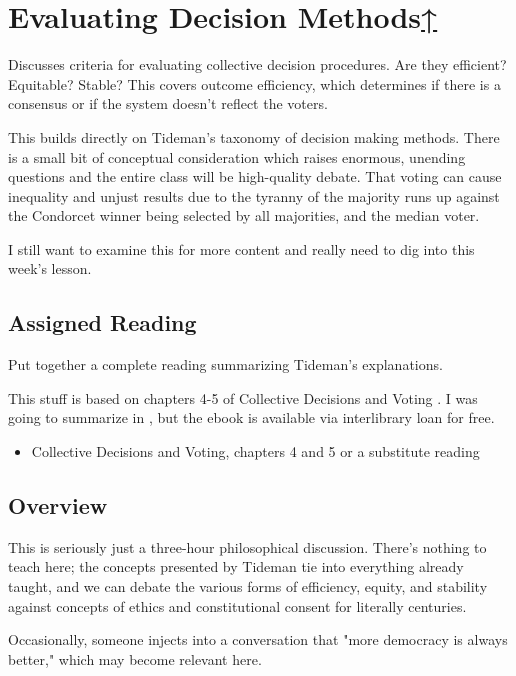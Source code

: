 \label{cur:evaluating-decision-methods}
\section{Evaluating Decision Methods\hyperref[syllabus]{↑}}

Discusses criteria for evaluating collective decision procedures.  Are they efficient?  Equitable?  Stable?  This covers outcome efficiency, which determines if there is a consensus or if the system doesn't reflect the voters.

This builds directly on Tideman's taxonomy of decision making methods.  There is a small bit of conceptual consideration which raises enormous, unending questions and the entire class will be high-quality debate.  That voting can cause inequality and unjust results due to the tyranny of the majority runs up against the Condorcet winner being selected by all majorities, and the median voter.

I still want to examine this for more content and really need to dig into this week's lesson.

\subsection{Assigned Reading}

\begin{todo}
    Put together a complete reading summarizing Tideman's explanations.
\end{todo}

\begin{boxcomment}
    This stuff is based on chapters 4-5 of Collective Decisions and Voting \autocite[35-56]{Tideman2006}.  I was going to summarize in , but the ebook is available via interlibrary loan for free.
\end{boxcomment}

\begin{itemize}
    \item Collective Decisions and Voting, chapters 4 and 5 \autocite[34-56]{Tideman2006} or a substitute reading
\end{itemize}

\subsection{Overview}

This is seriously just a three-hour philosophical discussion.  There's nothing to teach here; the concepts presented by Tideman tie into everything already taught, and we can debate the various forms of efficiency, equity, and stability against concepts of ethics and constitutional consent for literally centuries.

Occasionally, someone injects into a conversation that "more democracy is always better," which may become relevant here.